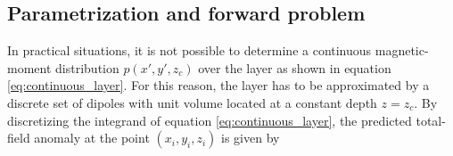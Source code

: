 
\subsection{Parametrization and forward problem}

In practical situations, it is not possible to determine a continuous magnetic-moment distribution $p(x',y',z_c)$ over the layer as shown in equation \ref{eq:continuous_layer}. For this reason, the layer has to be approximated by a discrete set of dipoles with unit volume located at a constant depth $z = z_c$. By discretizing the integrand of equation \ref{eq:continuous_layer}, the predicted total-field anomaly at the point $(x_i,y_i,z_i)$ is given by 

